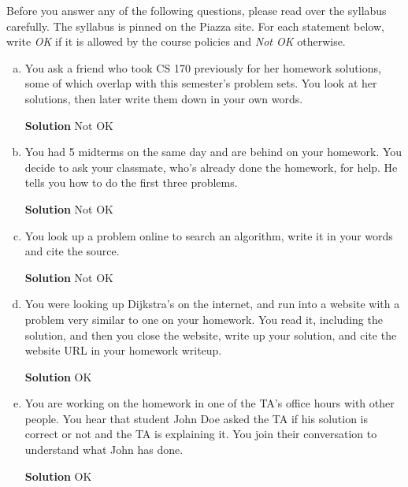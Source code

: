 \begin{qunlist}

Before you answer any of the following questions, please read over the syllabus carefully. The syllabus is pinned on the Piazza site. For each statement below, write \textit{OK} if it is allowed by the course policies and \textit{Not OK} otherwise.

\begin{enumerate}[(a)]
\item You ask a friend who took CS 170 previously for her homework solutions, some of which overlap with this semester's problem sets. You look at her solutions, then later write them down in your own words.
\begin{mdframed}
	\textbf{Solution} Not OK
\end{mdframed}

\item You had 5 midterms on the same day and are behind on your homework. You decide to ask your classmate, who's already done the homework, for help. He tells you how to do the first three problems.
\begin{mdframed}
	\textbf{Solution} Not OK
\end{mdframed}

\item You look up a problem online to search an algorithm, write it in your words and cite the source.
\begin{mdframed}
	\textbf{Solution} Not OK
\end{mdframed}

\item You were looking up Dijkstra's on the internet, and run into a website with a problem very similar to one on your homework. You read it, including the solution, and then you close the website, write up your solution, and cite the website URL in your homework writeup.
\begin{mdframed}
	\textbf{Solution} OK
\end{mdframed}

\item You are working on the homework in one of the TA's office hours with other people. You hear that student John Doe asked the TA if his solution is correct or not and the TA is explaining it. You join their conversation to understand what John has done.
\begin{mdframed}
	\textbf{Solution} OK
\end{mdframed}


\end{enumerate}
\end{qunlist}
